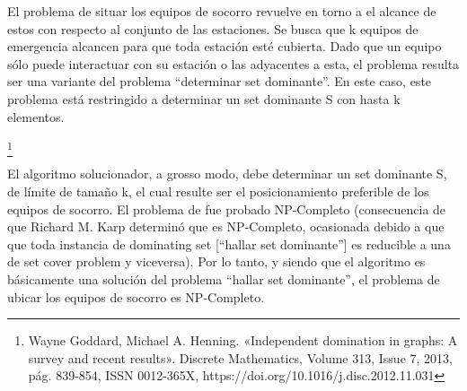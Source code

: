 \documentclass[../tp3_grupo404.tex]{subfiles}
\begin{document}
El problema de situar los equipos de socorro revuelve en torno a el alcance de estos con respecto al conjunto de las estaciones. Se busca que k equipos de emergencia alcancen para que toda estación esté cubierta. Dado que un equipo sólo puede interactuar con su estación o las adyacentes a esta, el problema resulta ser una variante del problema “determinar set dominante”. En este caso, este problema está restringido a determinar un set dominante S con hasta k elementos.

\footnote{Wayne Goddard, Michael A. Henning. «Independent domination in graphs: A survey and recent results». Discrete Mathematics, Volume 313, Issue 7, 2013, pág. 839-854,
ISSN 0012-365X, https://doi.org/10.1016/j.disc.2012.11.031}

El algoritmo solucionador, a grosso modo, debe determinar un set dominante S, de límite de tamaño k,
el cual resulte ser el posicionamiento preferible de los equipos de socorro. El problema de
 fue probado NP-Completo (consecuencia de que Richard M. Karp determinó
que  es NP-Completo, ocasionada debido a que que toda instancia de
dominating set [“hallar set dominante”] es reducible a una de set cover problem y viceversa).
Por lo tanto, y siendo que el algoritmo es básicamente una solución del problema “hallar set dominante”,
el problema de ubicar los equipos de socorro es NP-Completo.

\end{document}
